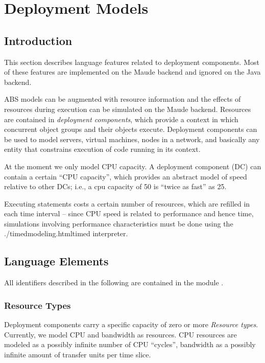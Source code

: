 \chapter{Deployment Models}\label{ch:resourcemodels}


\section{Introduction}

  This section describes language features related to deployment
  components.  Most of these features are implemented on the Maude
  backend and ignored on the Java backend.

  ABS models can be augmented with resource information and the effects
  of resources during execution can be simulated on the Maude backend.
  Resources are contained in \emph{deployment components}, which provide a
  context in which concurrent object groups and their objects execute.
  Deployment components can be used to model servers, virtual machines,
  nodes in a network, and basically any entity that constrains execution
  of code running in its context.

  At the moment we only model CPU capacity.  A deployment component (DC)
  can contain a certain ``CPU capacity'', which provides an abstract model
  of speed relative to other DCs; i.e., a cpu capacity of 50 is ``twice
  as fast'' as 25.

  Executing statements costs a certain number of resources, which are
  refilled in each time interval -- since CPU speed is related to
  performance and hence time, simulations involving performance
  characteristics must be done using the {{{./timedmodeling.html}timed
  interpreter}}.

\section{Language Elements}

  All identifiers described in the following are contained in the module
  .

\subsection{Resource Types}

Deployment components carry a specific capacity of zero or more \emph{Resource
  types}.  Currently, we model CPU and bandwidth as resources.  CPU resources
are modeled as a possibly infinite number of CPU ``cycles'', bandwidth as a possibly infinite amount of transfer units per time slice.


